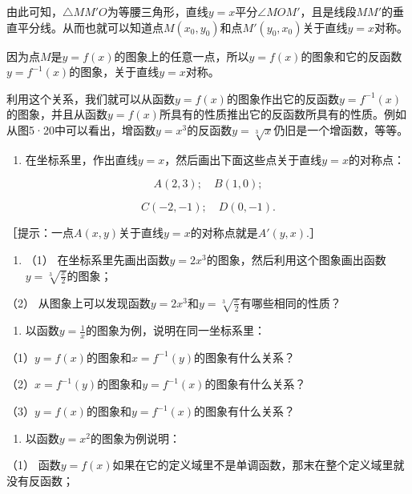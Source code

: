 由此可知，\(\triangle MM'O\)为等腰三角形，直线\(y = x\)平分\(\angle MOM'\)，且是线段\(MM'\)的垂直平分线。从而也就可以知道点\(M(x_0, y_0)\)和点\(M'(y_0, x_0)\)关于直线\(y = x\)对称。

因为点\(M\)是\(y = f(x)\)的图象上的任意一点，所以\(y = f(x)\)的图象和它的反函数\(y = f^{-1}(x)\)的图象，关于直线\(y = x\)对称。

利用这个关系，我们就可以从函数\(y = f(x)\)的图象作出它的反函数\(y = f^{-1}(x)\)的图象，并且从函数\(y=f(x)\)所具有的性质推出它的反函数所具有的性质。例如从图5·20中可以看出，增函数\(y = x^3\)的反函数\(y = \sqrt[3]{x}\)仍旧是一个增函数，等等。

\begin{enumerate}
\item
  在坐标系里，作出直线\(y = x\)，然后画出下面这些点关于直线\(y = x\)的对称点：
\end{enumerate}

\[
A (2, 3); \quad B (1, 0);
\]

\[
C (- 2, - 1); \quad D (0, - 1).
\]

［提示：一点\(A(x, y)\)关于直线\(y = x\)的对称点就是\(A'(y, x)\).］

\begin{enumerate}[start=2]
\item
  （1）
  在坐标系里先画出函数\(y = 2x^3\)的图象，然后利用这个图象画出函数\(y = \sqrt[3]{\frac{x}{2}}\)的图象；
\end{enumerate}

（2）
从图象上可以发现函数\(y = 2x^3\)和\(y = \sqrt[3]{\frac{x}{2}}\)有哪些相同的性质？

\begin{enumerate}[start=3]
\item
  以函数\(y = \frac{1}{x}\)的图象为例，说明在同一坐标系里：
\end{enumerate}

（1）\(y = f(x)\)的图象和\(x = f^{-1}(y)\)的图象有什么关系？

（2）\(x = f^{-1}(y)\)的图象和\(y = f^{-1}(x)\)的图象有什么关系？

（3）\(y = f(x)\)的图象和\(y = f^{-1}(x)\)的图象有什么关系？

\begin{enumerate}[start=4]
\item
  以函数\(y = x^2\)的图象为例说明：
\end{enumerate}

（1）
函数\(y = f(x)\)如果在它的定义域里不是单调函数，那末在整个定义域里就没有反函数；

